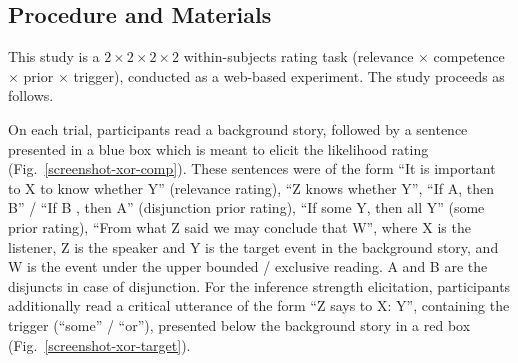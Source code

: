 \documentclass{sp}
\begin{document}
\subsection{Procedure and Materials}
This study is a $ 2 \times 2 \times 2 \times 2$ within-subjects rating task (relevance $\times$ competence $\times$ prior $\times$ trigger), conducted as a web-based experiment. The study proceeds as follows.

On each trial, participants read a background story, followed by a sentence presented in a blue box which is meant to elicit the likelihood rating (Fig.~\ref{screenshot-xor-comp}). These sentences were of the form ``It is important to X to know whether Y'' (relevance rating), ``Z knows whether Y'', ``If A, then B'' / ``If B , then A'' (disjunction prior rating), ``If some Y, then all Y'' (some prior rating), ``From what Z said we may conclude that W'', where X is the listener, Z is the speaker and Y is the target event in the background story, and W is the event under the upper bounded / exclusive reading. A and B are the disjuncts in case of disjunction. For the inference strength elicitation, participants additionally read a critical utterance of the form ``Z says to X: Y'', containing the trigger (``some'' / ``or''), presented below the background story in a red box (Fig.~\ref{screenshot-xor-target}).
\end{document}
